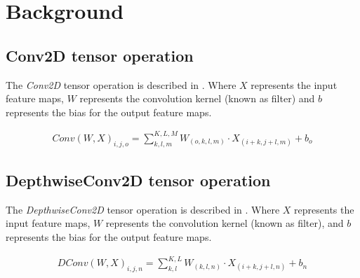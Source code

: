 \section{Background}
\label{sec:background}
\subsection{Conv2D tensor operation}
The \emph{Conv2D} tensor operation is described in . Where $X$ represents the input feature maps, $W$ represents the convolution kernel (known as filter) and $b$ represents the bias for the output feature maps\cite{goodfellow2016deep}.

\begin{eqnarray} \label{eq:conv2D}
Conv\left(W,X\right)_{i,j,o}=\sum_{k,l,m}^{K,L,M}W_{(o,k,l,m)} \cdot X_{(i+k,j+l,m)}+b_{o}
\end{eqnarray} 	
 	
\subsection{DepthwiseConv2D tensor operation}
The \emph{DepthwiseConv2D} tensor operation is described in . Where $X$ represents the input feature maps, $W$ represents the convolution kernel (known as filter), and $b$ represents the bias for the output feature maps.

\begin{eqnarray} \label{eq:dconv2D}
DConv\left(W,X\right)_{i,j,n}=\sum_{k,l}^{K,L}W_{(k,l,n)} \cdot X_{(i+k,j+l,n)}+b_{n}
\end{eqnarray}